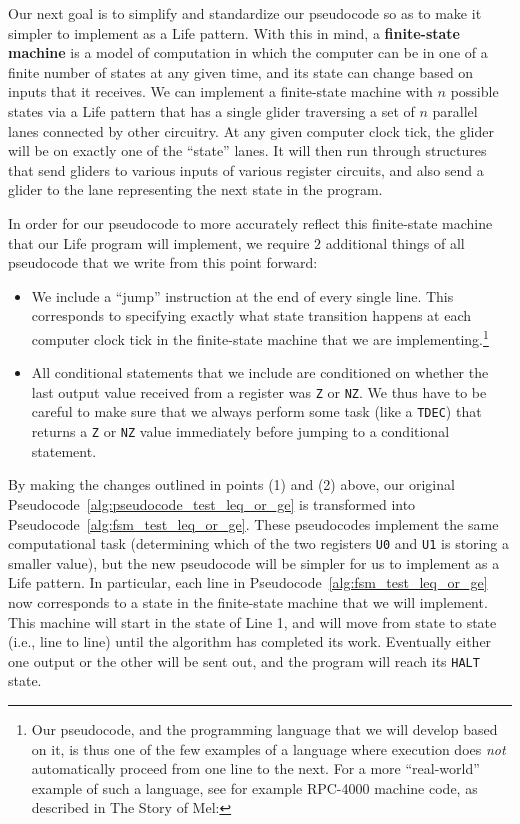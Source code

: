 Our next goal is to simplify and standardize our pseudocode so as to make it simpler to implement as a Life pattern. With this in mind, a \textbf{finite-state machine} is a model of computation in which the computer can be in one of a finite number of states at any given time, and its state can change based on inputs that it receives. We can implement a finite-state machine with $n$ possible states via a Life pattern that has a single glider traversing a set of $n$ parallel lanes connected by other circuitry.  At any given computer clock tick, the glider will be on exactly one of the ``state'' lanes. It will then run through structures that send gliders to various inputs of various register circuits, and also send a glider to the lane representing the next state in the program.

In order for our pseudocode to more accurately reflect this finite-state machine that our Life program will implement, we require $2$ additional things of all pseudocode that we write from this point forward:\smallskip

\begin{itemize}
	\item[1)] We include a ``jump'' instruction at the end of every single line. This corresponds to specifying exactly what state transition happens at each computer clock tick in the finite-state machine that we are implementing.\footnote{Our pseudocode, and the programming language that we will develop based on it, is thus one of the few examples of a language where execution does \emph{not} automatically proceed from one line to the next. For a more ``real-world'' example of such a language, see for example RPC-4000 machine code, as described in The Story of Mel: }\smallskip
	
	\item[2)] All conditional statements that we include are conditioned on whether the last output value received from a register was \texttt{Z} or \texttt{NZ}. We thus have to be careful to make sure that we always perform some task (like a \texttt{TDEC}) that returns a \texttt{Z} or \texttt{NZ} value immediately before jumping to a conditional statement.\smallskip
\end{itemize}

By making the changes outlined in points (1) and (2) above, our original Pseudocode~\ref{alg:pseudocode_test_leq_or_ge} is transformed into Pseudocode~\ref{alg:fsm_test_leq_or_ge}. These pseudocodes implement the same computational task (determining which of the two registers \texttt{U0} and \texttt{U1} is storing a smaller value), but the new pseudocode will be simpler for us to implement as a Life pattern. In particular, each line in Pseudocode~\ref{alg:fsm_test_leq_or_ge} now corresponds to a state in the finite-state machine that we will implement. This machine will start in the state of Line 1, and will move from state to state (i.e., line to line) until the algorithm has completed its work. Eventually either one output or the other will be sent out, and the program will reach its \texttt{HALT} state.

